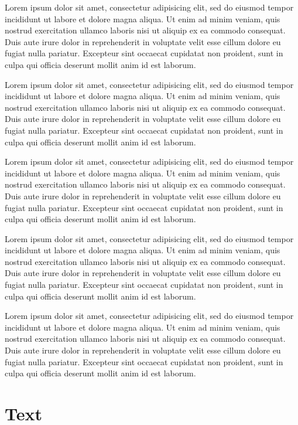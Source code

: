 \documentclass[10pt,a4paper,extrafontsizes,oldfontcommands,oneside]{memoir}
\begin{document}
Lorem ipsum dolor sit amet, consectetur adipisicing elit, sed do eiusmod tempor incididunt ut labore et dolore magna aliqua. Ut enim ad minim veniam, quis nostrud exercitation ullamco laboris nisi ut aliquip ex ea commodo consequat. Duis aute irure dolor in reprehenderit in voluptate velit esse cillum dolore eu fugiat nulla pariatur. Excepteur sint occaecat cupidatat non proident, sunt in culpa qui officia deserunt mollit anim id est laborum.

Lorem ipsum dolor sit amet, consectetur adipisicing elit, sed do eiusmod tempor incididunt ut labore et dolore magna aliqua. Ut enim ad minim veniam, quis nostrud exercitation ullamco laboris nisi ut aliquip ex ea commodo consequat. Duis aute irure dolor in reprehenderit in voluptate velit esse cillum dolore eu fugiat nulla pariatur. Excepteur sint occaecat cupidatat non proident, sunt in culpa qui officia deserunt mollit anim id est laborum.


\clearpage
Lorem ipsum dolor sit amet, consectetur adipisicing elit, sed do eiusmod tempor incididunt ut labore et dolore magna aliqua. Ut enim ad minim veniam, quis nostrud exercitation ullamco laboris nisi ut aliquip ex ea commodo consequat. Duis aute irure dolor in reprehenderit in voluptate velit esse cillum dolore eu fugiat nulla pariatur. Excepteur sint occaecat cupidatat non proident, sunt in culpa qui officia deserunt mollit anim id est laborum.

\clearpage
Lorem ipsum dolor sit amet, consectetur adipisicing elit, sed do eiusmod tempor incididunt ut labore et dolore magna aliqua. Ut enim ad minim veniam, quis nostrud exercitation ullamco laboris nisi ut aliquip ex ea commodo consequat. Duis aute irure dolor in reprehenderit in voluptate velit esse cillum dolore eu fugiat nulla pariatur. Excepteur sint occaecat cupidatat non proident, sunt in culpa qui officia deserunt mollit anim id est laborum.

\clearpage
Lorem ipsum dolor sit amet, consectetur adipisicing elit, sed do eiusmod tempor incididunt ut labore et dolore magna aliqua. Ut enim ad minim veniam, quis nostrud exercitation ullamco laboris nisi ut aliquip ex ea commodo consequat. Duis aute irure dolor in reprehenderit in voluptate velit esse cillum dolore eu fugiat nulla pariatur. Excepteur sint occaecat cupidatat non proident, sunt in culpa qui officia deserunt mollit anim id est laborum.


\section{Text} %
\label{sec:text}
\end{document}
